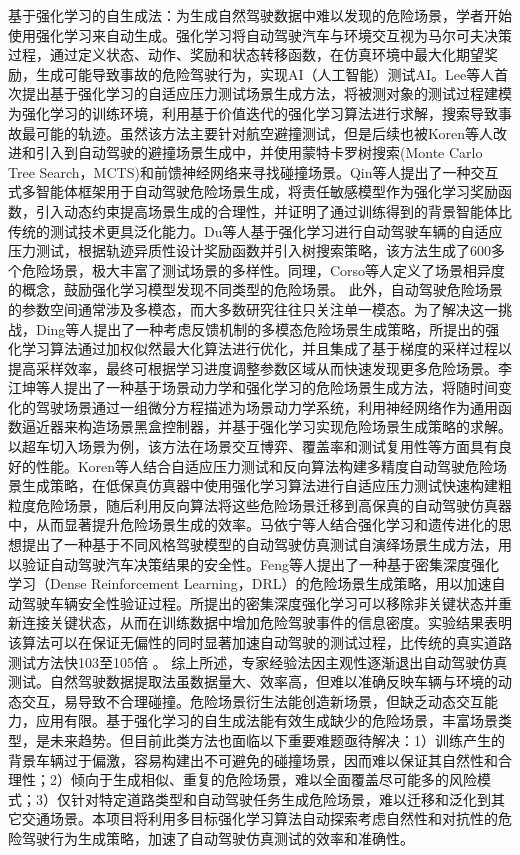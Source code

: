 基于强化学习的自生成法：为生成自然驾驶数据中难以发现的危险场景，学者开始使用强化学习来自动生成。强化学习将自动驾驶汽车与环境交互视为马尔可夫决策过程，通过定义状态、动作、奖励和状态转移函数，在仿真环境中最大化期望奖励，生成可能导致事故的危险驾驶行为，实现AI（人工智能）测试AI。Lee等人首次提出基于强化学习的自适应压力测试场景生成方法，将被测对象的测试过程建模为强化学习的训练环境，利用基于价值迭代的强化学习算法进行求解，搜索导致事故最可能的轨迹。虽然该方法主要针对航空避撞测试，但是后续也被Koren等人改进和引入到自动驾驶的避撞场景生成中，并使用蒙特卡罗树搜索(Monte Carlo Tree Search，MCTS)和前馈神经网络来寻找碰撞场景。Qin等人提出了一种交互式多智能体框架用于自动驾驶危险场景生成，将责任敏感模型作为强化学习奖励函数，引入动态约束提高场景生成的合理性，并证明了通过训练得到的背景智能体比传统的测试技术更具泛化能力。Du等人基于强化学习进行自动驾驶车辆的自适应压力测试，根据轨迹异质性设计奖励函数并引入树搜索策略，该方法生成了600多个危险场景，极大丰富了测试场景的多样性。同理，Corso等人定义了场景相异度的概念，鼓励强化学习模型发现不同类型的危险场景。
此外，自动驾驶危险场景的参数空间通常涉及多模态，而大多数研究往往只关注单一模态。为了解决这一挑战，Ding等人提出了一种考虑反馈机制的多模态危险场景生成策略，所提出的强化学习算法通过加权似然最大化算法进行优化，并且集成了基于梯度的采样过程以提高采样效率，最终可根据学习进度调整参数区域从而快速发现更多危险场景。李江坤等人提出了一种基于场景动力学和强化学习的危险场景生成方法，将随时间变化的驾驶场景通过一组微分方程描述为场景动力学系统，利用神经网络作为通用函数逼近器来构造场景黑盒控制器，并基于强化学习实现危险场景生成策略的求解。以超车切入场景为例，该方法在场景交互博弈、覆盖率和测试复用性等方面具有良好的性能。Koren等人结合自适应压力测试和反向算法构建多精度自动驾驶危险场景生成策略，在低保真仿真器中使用强化学习算法进行自适应压力测试快速构建粗粒度危险场景，随后利用反向算法将这些危险场景迁移到高保真的自动驾驶仿真器中，从而显著提升危险场景生成的效率。马依宁等人结合强化学习和遗传进化的思想提出了一种基于不同风格驾驶模型的自动驾驶仿真测试自演绎场景生成方法，用以验证自动驾驶汽车决策结果的安全性。Feng等人提出了一种基于密集深度强化学习（Dense Reinforcement Learning，DRL）的危险场景生成策略，用以加速自动驾驶车辆安全性验证过程。所提出的密集深度强化学习可以移除非关键状态并重新连接关键状态，从而在训练数据中增加危险驾驶事件的信息密度。实验结果表明该算法可以在保证无偏性的同时显著加速自动驾驶的测试过程，比传统的真实道路测试方法快103至105倍 \cite{cheng2011analysis}。
综上所述，专家经验法因主观性逐渐退出自动驾驶仿真测试。自然驾驶数据提取法虽数据量大、效率高，但难以准确反映车辆与环境的动态交互，易导致不合理碰撞。危险场景衍生法能创造新场景，但缺乏动态交互能力，应用有限。基于强化学习的自生成法能有效生成缺少的危险场景，丰富场景类型，是未来趋势。但目前此类方法也面临以下重要难题亟待解决：1）训练产生的背景车辆过于偏激，容易构建出不可避免的碰撞场景，因而难以保证其自然性和合理性；2）倾向于生成相似、重复的危险场景，难以全面覆盖尽可能多的风险模式；3）仅针对特定道路类型和自动驾驶任务生成危险场景，难以迁移和泛化到其它交通场景。本项目将利用多目标强化学习算法自动探索考虑自然性和对抗性的危险驾驶行为生成策略，加速了自动驾驶仿真测试的效率和准确性。
